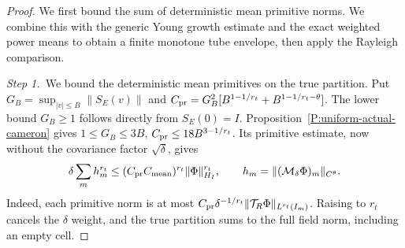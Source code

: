 \begin{proof}
  We first bound the sum of deterministic mean primitive norms. We combine
  this with the generic Young growth estimate and the exact weighted power
  means to obtain a finite monotone tube envelope, then apply the Rayleigh
  comparison.


  \medskip
  \noindent\textit{Step 1.~}We bound the deterministic mean primitives on the
  true partition.
  Put $G_B = \sup_{|v|\le B}\|S_E(v)\|$ and $C_{\rm pr} =
  G_B^2[B^{1-1/r_t}+B^{1-1/r_t-\theta}]$. The lower bound $G_B \ge 1$ follows
  directly from $S_E(0) = I$. Proposition~\ref{P:uniform-actual-cameron} gives
  $1 \le G_B \le 3B$, $C_{\rm pr} \le 18B^{3-1/r_t}$. Its primitive estimate,
  now without the covariance factor $\sqrt\delta$, gives
  \begin{equation}\label{E:tube-primitive-sum}
    \delta\sum_m h_m^{r_t}
    \le(C_{\rm pr}C_{\rm mean})^{r_t}\|\Phi\|_{H_I}^{r_t},
    \qquad h_m=\|(\mathcal{M}_\delta\Phi)_m\|_{C^\theta}.
  \end{equation}
  Indeed, each primitive norm is at most $C_{\rm pr}\delta^{-1/r_t}
  \|\mathcal{T}_R\Phi\|_{L^{r_t}(I_m)}$. Raising to $r_t$ cancels the $\delta$
  weight, and the true partition sums to the full field norm, including an empty
  cell.



\end{proof}
